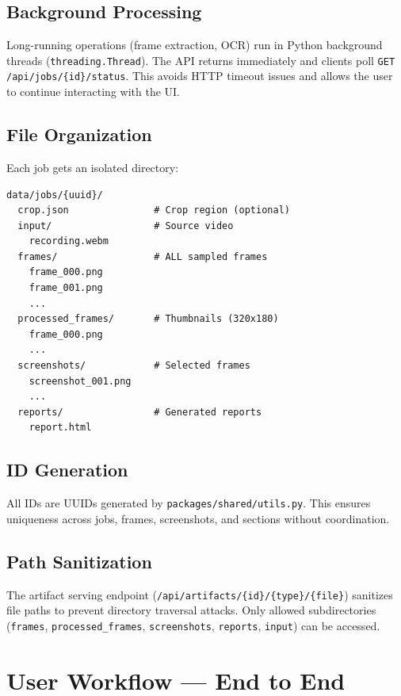 \documentclass[12pt, a4paper]{article}
\newcommand{\codeinline}[1]{\texttt{\small\colorbox{codebg}{#1}}}
\newcommand{\filepath}[1]{\texttt{\small #1}}
\begin{document}
\subsection{Background Processing}

Long-running operations (frame extraction, OCR) run in Python background threads (\codeinline{threading.Thread}). The API returns immediately and clients poll \codeinline{GET /api/jobs/\{id\}/status}. This avoids HTTP timeout issues and allows the user to continue interacting with the UI.

\subsection{File Organization}

Each job gets an isolated directory:

\begin{lstlisting}[style=plain]
data/jobs/{uuid}/
  crop.json               # Crop region (optional)
  input/                  # Source video
    recording.webm
  frames/                 # ALL sampled frames
    frame_000.png
    frame_001.png
    ...
  processed_frames/       # Thumbnails (320x180)
    frame_000.png
    ...
  screenshots/            # Selected frames
    screenshot_001.png
    ...
  reports/                # Generated reports
    report.html
\end{lstlisting}

\subsection{ID Generation}

All IDs are UUIDs generated by \filepath{packages/shared/utils.py}. This ensures uniqueness across jobs, frames, screenshots, and sections without coordination.

\subsection{Path Sanitization}

The artifact serving endpoint (\codeinline{/api/artifacts/\{id\}/\{type\}/\{file\}}) sanitizes file paths to prevent directory traversal attacks. Only allowed subdirectories (\codeinline{frames}, \codeinline{processed\_frames}, \codeinline{screenshots}, \codeinline{reports}, \codeinline{input}) can be accessed.

\section{User Workflow --- End to End}
\end{document}
